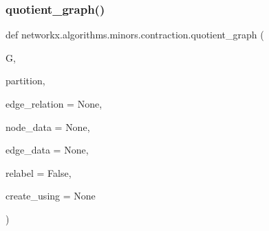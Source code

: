 \subsubsection{\texorpdfstring{quotient\+\_\+graph()}{quotient\_graph()}}
{\footnotesize\ttfamily def networkx.\+algorithms.\+minors.\+contraction.\+quotient\+\_\+graph (\begin{DoxyParamCaption}\item[{}]{G,  }\item[{}]{partition,  }\item[{}]{edge\+\_\+relation = {\ttfamily None},  }\item[{}]{node\+\_\+data = {\ttfamily None},  }\item[{}]{edge\+\_\+data = {\ttfamily None},  }\item[{}]{relabel = {\ttfamily False},  }\item[{}]{create\+\_\+using = {\ttfamily None} }\end{DoxyParamCaption})}

